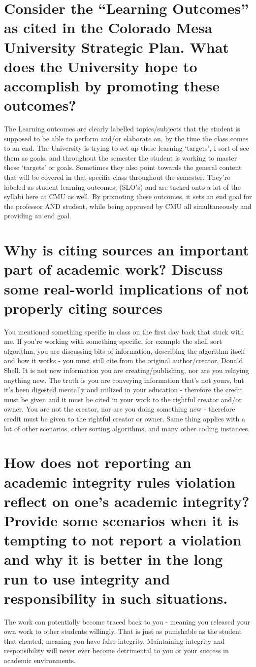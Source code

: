 \documentclass[12pt]{article} %
\begin{document}
\section{Consider the “Learning Outcomes” as cited in the Colorado Mesa University Strategic Plan. What does the University hope to accomplish by promoting these outcomes?}

\tab 
The Learning outcomes are clearly labelled topics/subjects that the student is supposed to be able to perform and/or elaborate on, by the time the class comes to an end. The University is trying to set up these learning ‘targets’, I sort of see them as goals, and throughout the semester the student is working to master these ‘targets' or goals. Sometimes they also point towards the general content that will be covered in that specific class throughout the semester. They’re labeled as student learning outcomes, (SLO’s) and are tacked onto a lot of the syllabi here at CMU as well. By promoting these outcomes, it sets an end goal for the professor AND student, while being approved by CMU all simultaneously and providing an end goal. 


\section{Why is citing sources an important part of academic work? Discuss some real-world implications of not properly citing sources}
\tab
You mentioned something specific in class on the first day back that stuck with me. If you’re working with something specific, for example the shell sort algorithm,  you are discussing bits of information, describing the algorithm itself and how it works - you must still cite from the original author/creator, Donald Shell. It is not new information you are creating/publishing, nor are you relaying anything new. The truth is you are conveying information that’s not yours, but it’s been digested mentally and utilized in your education - therefore the credit must be given and it must be cited in your work to the rightful creator and/or owner. You are not the creator, nor are you doing something new - therefore credit must be given to the rightful creator or owner. Same thing applies with a lot of other scenarios, other sorting algorithms, and many other coding instances. 


\section{How does not reporting an academic integrity rules violation reflect on one’s academic integrity? Provide some scenarios when it is tempting to not report a violation and why it is better in the long run to use integrity and responsibility in such situations.}
\tab
The work can potentially become traced back to you - meaning you released your own work to other students willingly. That is just as punishable as the student that cheated, meaning you have false integrity. Maintaining integrity and responsibility will never ever become detrimental to you or your success in academic environments. 
\end{document}
